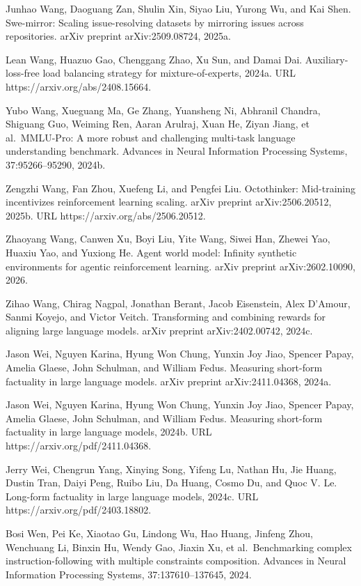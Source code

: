 Junhao Wang, Daoguang Zan, Shulin Xin, Siyao Liu, Yurong Wu, and Kai
Shen. Swe-mirror: Scaling issue-resolving datasets by mirroring issues
across repositories. arXiv preprint arXiv:2509.08724, 2025a.

Lean Wang, Huazuo Gao, Chenggang Zhao, Xu Sun, and Damai Dai.
Auxiliary-loss-free load balancing strategy for mixture-of-experts,
2024a. URL https://arxiv.org/abs/2408.15664.

Yubo Wang, Xueguang Ma, Ge Zhang, Yuansheng Ni, Abhranil Chandra,
Shiguang Guo, Weiming Ren, Aaran Arulraj, Xuan He, Ziyan Jiang, et
al.~MMLU-Pro: A more robust and challenging multi-task language
understanding benchmark. Advances in Neural Information Processing
Systems, 37:95266--95290, 2024b.

Zengzhi Wang, Fan Zhou, Xuefeng Li, and Pengfei Liu. Octothinker:
Mid-training incentivizes reinforcement learning scaling. arXiv preprint
arXiv:2506.20512, 2025b. URL https://arxiv.org/abs/2506.20512.

Zhaoyang Wang, Canwen Xu, Boyi Liu, Yite Wang, Siwei Han, Zhewei Yao,
Huaxiu Yao, and Yuxiong He. Agent world model: Infinity synthetic
environments for agentic reinforcement learning. arXiv preprint
arXiv:2602.10090, 2026.

Zihao Wang, Chirag Nagpal, Jonathan Berant, Jacob Eisenstein, Alex
D'Amour, Sanmi Koyejo, and Victor Veitch. Transforming and combining
rewards for aligning large language models. arXiv preprint
arXiv:2402.00742, 2024c.

Jason Wei, Nguyen Karina, Hyung Won Chung, Yunxin Joy Jiao, Spencer
Papay, Amelia Glaese, John Schulman, and William Fedus. Measuring
short-form factuality in large language models. arXiv preprint
arXiv:2411.04368, 2024a.

Jason Wei, Nguyen Karina, Hyung Won Chung, Yunxin Joy Jiao, Spencer
Papay, Amelia Glaese, John Schulman, and William Fedus. Measuring
short-form factuality in large language models, 2024b. URL
https://arxiv.org/pdf/2411.04368.

Jerry Wei, Chengrun Yang, Xinying Song, Yifeng Lu, Nathan Hu, Jie Huang,
Dustin Tran, Daiyi Peng, Ruibo Liu, Da Huang, Cosmo Du, and Quoc V. Le.
Long-form factuality in large language models, 2024c. URL
https://arxiv.org/pdf/2403.18802.

Bosi Wen, Pei Ke, Xiaotao Gu, Lindong Wu, Hao Huang, Jinfeng Zhou,
Wenchuang Li, Binxin Hu, Wendy Gao, Jiaxin Xu, et al.~Benchmarking
complex instruction-following with multiple constraints composition.
Advances in Neural Information Processing Systems, 37:137610--137645,
2024.


